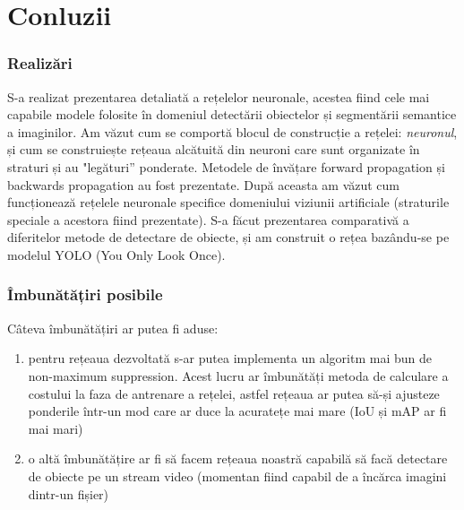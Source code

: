 \chapter{Conluzii}
\label{cap:concluzii}


\subsection{Realizări}
S-a realizat prezentarea detaliată a rețelelor neuronale, acestea fiind cele mai capabile modele folosite în domeniul detectării obiectelor și segmentării semantice a imaginilor. Am văzut cum se comportă blocul de construcție a rețelei: \textit{neuronul}, și cum se construiește rețeaua alcătuită din neuroni care sunt organizate în straturi și au "legături'' ponderate. Metodele de învățare forward propagation și backwards propagation au fost prezentate.\newline
După aceasta am văzut cum funcționează rețelele neuronale specifice domeniului viziunii artificiale (straturile speciale a acestora fiind prezentate).\newline
S-a făcut prezentarea comparativă a diferitelor metode de detectare de obiecte, și am construit o rețea bazându-se pe modelul YOLO (You Only Look Once).


\subsection{Îmbunătățiri posibile}
Câteva îmbunătățiri ar putea fi aduse:
\begin{enumerate}
	\item pentru rețeaua dezvoltată s-ar putea implementa un algoritm mai bun de non-maximum suppression. Acest lucru ar îmbunătăți metoda de calculare a costului la faza de antrenare a rețelei, astfel rețeaua ar putea să-și ajusteze ponderile într-un mod care ar duce la acuratețe mai mare (IoU și mAP ar fi mai mari)
	\item o altă îmbunătățire ar fi să facem rețeaua noastră capabilă să facă detectare de obiecte pe un stream video (momentan fiind capabil de a încărca imagini dintr-un fișier)
\end{enumerate}